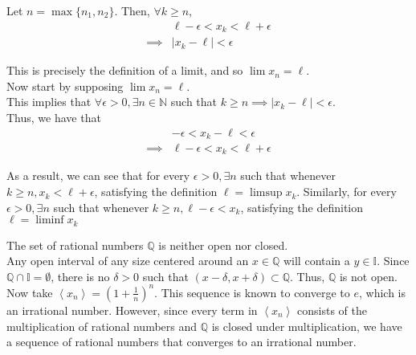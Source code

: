 \documentclass[12pt]{article}
\newenvironment{problem}[2][Problem]{\begin{trivlist}
\item[\hskip \labelsep {\bfseries #1}\hskip \labelsep {\bfseries #2.}]}{\end{trivlist}}
\begin{document}
\begin{enumerate}[i)]
	Let $n = \max{\{n_1, n_2\}}$. Then, $\forall k \geq n$, 
	\begin{align*}
		&\ell - \epsilon < x_k < \ell + \epsilon\\
		\implies &| x_k - \ell | < \epsilon
	\end{align*}
	
	This is precisely the definition of a limit, and so $\lim{x_n} = \ell$.\\
	
	Now start by supposing $\lim{x_n} = \ell$.\\
	
	This implies that $\forall \epsilon > 0, \exists n \in \mathbb{N}$ such that $k \geq n \implies |x_k - \ell| < \epsilon$.\\
	
	Thus, we have that
	\begin{align*}
	&-\epsilon < x_k - \ell < \epsilon\\
	\implies &\ell - \epsilon < x_k < \ell + \epsilon
	\end{align*}
	
	As a result, we can see that for every $\epsilon > 0, \exists n$ such that whenever $k \geq n, x_k < \ell + \epsilon$, satisfying the definition $\ell = \limsup{x_k}$. Similarly, for every $\epsilon > 0, \exists n$ such that whenever $k \geq n, \ell - \epsilon < x_k$, satisfying the definition $\ell = \liminf{x_k}$

\end{enumerate}

\begin{problem}{3}
\end{problem}

The set of rational numbers $\mathbb{Q}$ is neither open nor closed.\\

Any open interval of any size centered around an $x \in \mathbb{Q}$ will contain a $y \in \mathbb{I}$. Since $\mathbb{Q} \cap \mathbb{I} = \emptyset$, there is no $\delta > 0$ such that $(x - \delta, x + \delta) \subset \mathbb{Q}$. Thus, $\mathbb{Q}$ is not open.\\

Now take $\left<x_n\right> = (1 + \frac{1}{n})^n$. This sequence is known to converge to $e$, which is an irrational number. However, since every term in $\left<x_n\right>$ consists of the multiplication of rational numbers and $\mathbb{Q}$ is closed under multiplication, we have a sequence of rational numbers that converges to an irrational number.\\
\end{document}

